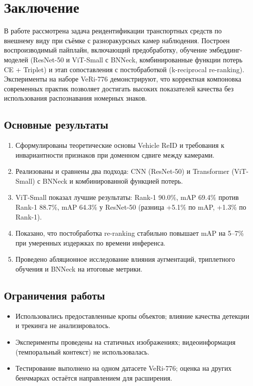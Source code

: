 {\huge\chapter{Заключение}}
\label{sec:Chapter4} 

В работе рассмотрена задача реидентификации транспортных средств по внешнему виду при съёмке с разноракурсных камер наблюдения. Построен воспроизводимый пайплайн, включающий предобработку, обучение эмбеддинг-моделей (ResNet-50 и ViT-Small с BNNeck, комбинированные функции потерь CE + Triplet) и этап сопоставления с постобработкой (k-reciprocal re-ranking). Эксперименты на наборе VeRi-776 демонстрируют, что корректная компоновка современных практик позволяет достигать высоких показателей качества без использования распознавания номерных знаков.

\section*{Основные результаты}
\begin{enumerate}
  \item Сформулированы теоретические основы Vehicle ReID и требования к инвариантности признаков при доменном сдвиге между камерами.
  \item Реализованы и сравнены два подхода: CNN (ResNet-50) и Transformer (ViT-Small) с BNNeck и комбинированной функцией потерь.
  \item ViT-Small показал лучшие результаты: Rank-1 90.0\%, mAP 69.4\% против Rank-1 88.7\%, mAP 64.3\% у ResNet-50 (разница +5.1\% по mAP, +1.3\% по Rank-1).
  \item Показано, что постобработка re-ranking стабильно повышает mAP на 5--7\% при умеренных издержках по времени инференса.
  \item Проведено абляционное исследование влияния аугментаций, триплетного обучения и BNNeck на итоговые метрики.
\end{enumerate}

\section*{Ограничения работы}
\begin{itemize}
  \item Использовались предоставленные кропы объектов; влияние качества детекции и трекинга не анализировалось.
  \item Эксперименты проведены на статичных изображениях; видеоинформация (темпоральный контекст) не использовалась.
  \item Тестирование выполнено на одном датасете VeRi-776; оценка на других бенчмарках остаётся направлением для расширения.
\end{itemize}

